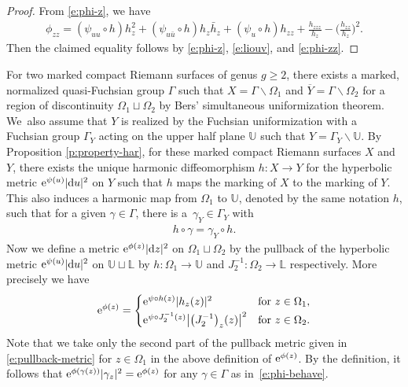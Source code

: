 \documentclass[pdftex]{sigma}%
\numberwithin{equation}{section}
\begin{document}
\begin{proof}From \eqref{e:phi-z}, we have
\begin{gather}\label{e:phi-zz}
\phi_{zz}=(\psi_{uu}\circ h) h_z^2 +(\psi_{u\bar{u}}\circ h) h_z \bar{h}_z +(\psi_u\circ h) h_{zz} +\frac{h_{zzz}}{h_z} -\bigg(\frac{h_{zz}}{h_z}\bigg)^2.
\end{gather}
Then the claimed equality follows by \eqref{e:phi-z}, \eqref{e:liouv}, and \eqref{e:phi-zz}.
\end{proof}

For two marked compact Riemann surfaces of genus $g\ge2$, there exists a marked, normalized quasi-Fuchsian group $\Gamma$ such that $X=\Gamma\backslash \Omega_1$ and $\overline{Y}=\Gamma\backslash \Omega_2$ for a region of discontinuity
$\Omega_1\sqcup \Omega_2$ by Bers' simultaneous uniformization theorem. We~also assume that
$Y$ is realized by the Fuchsian uniformization with a Fuchsian group $\Gamma_Y$ acting on the upper half plane $\mathbb{U}$ such that $Y = \Gamma_Y\backslash \mathbb{U}$. By Proposition \ref{p:property-har}, for these marked compact Riemann surfaces $X$ and $Y$, there exists the unique harmonic diffeomorphism $h\colon X\to Y$ for the hyperbolic metric ${\rm e}^{\psi(u)}|{\rm d}u|^2$ on $Y$ such that $h$ maps the marking of $X$ to the marking of $Y$. This also induces a harmonic map from $\Omega_1$ to $\mathbb{U}$, denoted by the same notation $h$, such that for a given $\gamma\in\Gamma$, there is a~$\gamma_Y\in \Gamma_Y$ with
\begin{gather*}
h\circ \gamma =\gamma_Y \circ h.
\end{gather*}
Now we define a metric ${\rm e}^{\phi(z)}|{\rm d}z|^2$ on $\Omega_1\sqcup \Omega_2$ by the pullback of the hyperbolic metric ${\rm e}^{\psi(u)}|{\rm d}u|^2$ on $\mathbb{U}\sqcup \mathbb{L}$ by $h\colon \Omega_1\to\mathbb{U}$
and $J^{-1}_2\colon \Omega_2\to \mathbb{L}$ respectively.
More precisely we have
\begin{gather*}
{\rm e}^{\phi(z)}=\begin{cases}
{\rm e}^{\psi\circ h(z)} |h_z(z)|^2 &\text{for} \ z\in \Omega_1,
\\[.5ex]
 {\rm e}^{\psi\circ J_2^{-1}(z)} \big|\big(J_2^{-1}\big)_z(z)\big|^2 &\text{for} \ z\in \Omega_2.
 \end{cases}
\end{gather*}
Note that we take only the second part of the pullback metric given in \eqref{e:pullback-metric} for $z\in \Omega_1$ in the above definition of ${\rm e}^{\phi(z)}$. By the definition, it follows that ${\rm e}^{\phi(\gamma(z))} |\gamma_z|^2 = {\rm e}^{\phi(z)}$ for any $\gamma\in\Gamma$ as in~\eqref{e:phi-behave}.
\end{document}

